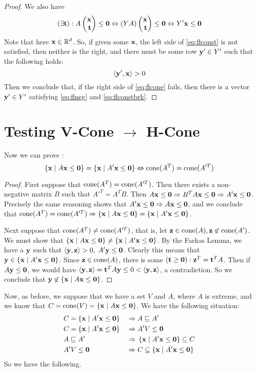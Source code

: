 \begin{proof}
	We also have
	\begin{equation}\label{eq:flconst}
		(\exists \t) : A \xt \leq \0 \Leftrightarrow
		(YA)\xt \leq \0 \Leftrightarrow
		Y'\x \leq \0
	\end{equation}
	Note that here $\x \in \R^d$.  So, if given some $\x$, the left side of \eqref{eq:flconst} is not satisfied, then neither is the right, and there must be some row $\y' \in Y'$ such that the following holds:
	\begin{equation}\label{eq:flconstbrk} \ip{\y'}{\x} > 0 \end{equation}
	Then we conclude that, if the right side of \eqref{eq:flcone} fails, then there is a vector $\y' \in Y'$ satisfying \eqref{eq:flneg} and \eqref{eq:flconstbrk}.
\end{proof}

\section{Testing V-Cone $\to$ H-Cone}

Now we can prove :
\[ \HC{A} = \HC{A'} \Leftrightarrow \cone(A^T) = \cone(A'^T) \]

\begin{proof}
	First suppose that $\cone(A^T) = \cone(A'^T)$.  Then there exists a non-negative matrix $B$ such that $A'^T = A^TB$.  Then $A\x \leq \0 \Rightarrow B^TA\x\leq \0 \Rightarrow A'\x\leq\0$.  Precisely the same reasoning shows that $A'\x\leq\0 \Rightarrow A\x\leq\0$, and we conclude that $\cone(A^T) = \cone(A'^T) \Rightarrow \HC{A} = \HC{A'}$.

	Next suppose that $\cone(A^T) \neq \cone(A'^T)$, that is, let $\z \in \cone(A), \z \not\in\cone(A')$.  We must show that $\HC{A} \neq \HC{A'}$.  By the Farkas Lemma, we have a $\y$ such that $\ip{\y}{\z} > 0,\; A'\y \leq \0$.  Clearly this means that $\y \in \HC{A'}$.  Since $\z \in \cone(A)$, there is some $(\t \geq \0): \z^T = \t^T A$.  Then if $A\y\leq\0$, we would have $\ip{\y}{\z} = \t^T A\y \leq 0 < \ip{\y}{\z}$, a contradiction.  So we conclude that $\y\not\in\HC{A}$.
\end{proof}

Now, as before, we suppose that we have a set $V$ and $A$, where $A$ is extreme, and we know that $C = \cone(V) = \HC{A}$.  We have the following situation:
\begin{alignat*}{2}
	 & C = \HC{A'}    \;   & \Rightarrow & \; A \sqsubseteq A'    \\
	 & C = \HC{A'}    \;   & \Rightarrow & \; A'V\leq\0           \\
	 & A \sqsubseteq A' \; & \Rightarrow & \; \HC{A'} \subseteq C \\
	 & A'V\leq\0  \;       & \Rightarrow & \; C \subseteq \HC{A'}
\end{alignat*}
So we have the following.

